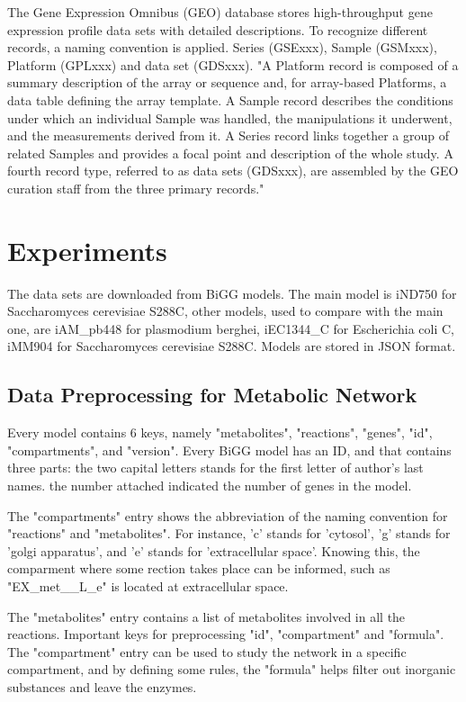 \documentclass{article} %
\begin{document}
The Gene Expression Omnibus (GEO) database stores high-throughput gene expression profile data sets with detailed descriptions. \cite{clough_gene_2016} To recognize different records, a naming convention is applied. Series (GSExxx), Sample (GSMxxx), Platform (GPLxxx) and data set (GDSxxx). "A Platform record is composed of a summary description of the array or sequence and, for array-based Platforms, a data table defining the array template. A Sample record describes the conditions under which an individual Sample was handled, the manipulations it underwent, and the measurements derived from it. A Series record links together a group of related Samples and provides a focal point and description of the whole study. A fourth record type, referred to as data sets (GDSxxx), are assembled by the GEO curation staff from the three primary records."

\section{Experiments} \label{section:experiments}
The data sets are downloaded from BiGG models. The main model is iND750 for Saccharomyces cerevisiae S288C, other models, used to compare with the main one, are iAM\_pb448 for plasmodium berghei, iEC1344\_C for Escherichia coli C, iMM904 for Saccharomyces cerevisiae S288C. Models are stored in JSON format.

\subsection{Data Preprocessing for Metabolic Network}
Every model contains 6 keys, namely "metabolites", "reactions", "genes", "id", "compartments", and "version". Every BiGG model has an ID, and that contains three parts: the two capital letters stands for the first letter of author's last names. the number attached indicated the number of genes in the model. 

The "compartments" entry shows the abbreviation of the naming convention for "reactions" and "metabolites". For instance, 'c' stands for 'cytosol', 'g' stands for 'golgi apparatus', and 'e' stands for 'extracellular space'. Knowing this, the comparment where  some rection takes place can be informed, such as "EX\_met\_\_L\_e" is located at extracellular space.

The "metabolites" entry contains a list of metabolites involved in all the reactions. Important keys for preprocessing "id", "compartment" and "formula". The "compartment" entry can be used to study the network in a specific compartment, and by defining some rules, the "formula" helps filter out inorganic substances and leave the enzymes.
\end{document}
